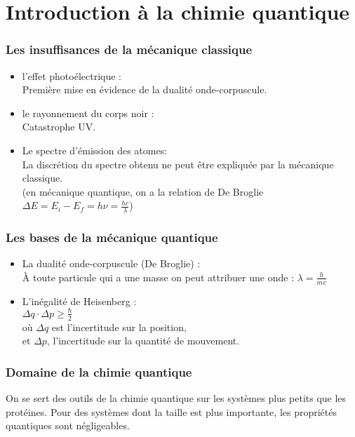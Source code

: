 \documentclass[../main.tex]{subfile}
\begin{document}
\part{Introduction à la chimie quantique}
\section{Les insuffisances de la mécanique classique}
\begin{itemize}
	\item l'effet photoélectrique : \\Première mise en évidence de la dualité onde-corpuscule.
	\item le rayonnement du corps noir : \\Catastrophe UV.
	\item Le spectre d'émission des atomes: \\La discrétion du spectre obtenu ne peut être expliquée par la mécanique classique.
	\\(en mécanique quantique, on a la relation de De Broglie $\Delta E = E_i - E_f = h \nu = \frac{h c}{\lambda}$)
\end{itemize}

\section{Les bases de la mécanique quantique}
\begin{itemize}
	\item La dualité onde-corpuscule (De Broglie) : 
	\\ \`A toute particule qui a une masse on peut attribuer une onde : $\lambda = \frac{h}{m v}$
	\item L'inégalité de Heisenberg : 
	\\ $\Delta q \cdot \Delta p \geq \frac{\hbar}{2}$
	\\ où $\Delta q$ est l'incertitude sur la position,
	\\ et $\Delta p$, l'incertitude sur la quantité de mouvement.
\end{itemize}

\section{Domaine de la chimie quantique}
On se sert des outils de la chimie quantique sur les systèmes plus petits que les protéines. Pour des systèmes dont la taille est plus importante, les propriétés quantiques sont négligeables.
\end{document}
